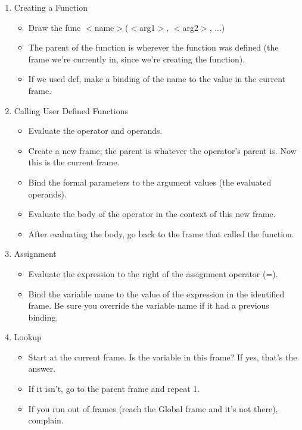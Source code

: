 \begin{blocksection}
\begin{enumerate}
    \item Creating a Function
        \begin{itemize}
            \item Draw the func $<$name$>$($<$arg1$>$, $<$arg2$>$, ...)
            \item The parent of the function is wherever the function was defined (the frame we're currently in, since we're creating the function).
            \item If we used def, make a binding of the name to the value in the current frame.
        \end{itemize}
    \item Calling User Defined Functions
		\begin{itemize}
			\item Evaluate the operator and operands.
			\item Create a new frame; the parent is whatever the operator's parent is. Now this is the current frame.
			\item Bind the formal parameters to the argument values (the evaluated operands).
			\item Evaluate the body of the operator in the context of this new frame.
			\item After evaluating the body, go back to the frame that called the function.
		\end{itemize}
    \item Assignment
    		\begin{itemize}
    			\item Evaluate the expression to the right of the assignment operator (=).
			\item Bind the variable name to the value of the expression in the identified frame. Be sure you override the variable name if it had a previous binding.
    		\end{itemize}
    	\item Lookup
    		\begin{itemize}
    			\item Start at the current frame. Is the variable in this frame? If yes, that's the answer.
			\item If it isn't, go to the parent frame and repeat 1.
			\item If you run out of frames (reach the Global frame and it's not there), complain.
    		\end{itemize}
\end{enumerate}
\end{blocksection}
